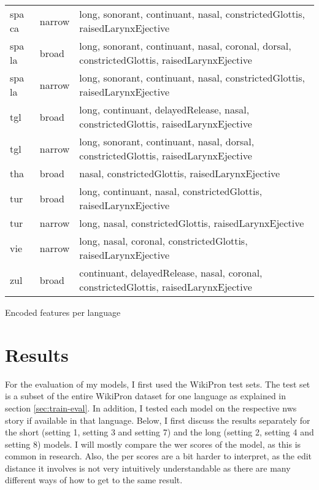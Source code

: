 {\begin{tabularx}{1.3\textwidth}{|llX|}
spa ca             & narrow        & long, sonorant, continuant, nasal, constrictedGlottis, raisedLarynxEjective                                                        \\
spa la             & broad         & long, sonorant, continuant, nasal, coronal, dorsal, constrictedGlottis, raisedLarynxEjective                                       \\
spa la             & narrow        & long, sonorant, continuant, nasal, constrictedGlottis, raisedLarynxEjective                                                        \\
tgl                & broad         & long, continuant, delayedRelease, nasal, constrictedGlottis, raisedLarynxEjective                                                  \\
tgl                & narrow        & long, sonorant, continuant, nasal, dorsal, constrictedGlottis, raisedLarynxEjective                                                \\
tha                & broad         & nasal, constrictedGlottis, raisedLarynxEjective                                                                                    \\
tur                & broad         & long, continuant, nasal, constrictedGlottis, raisedLarynxEjective                                                                  \\
tur                & narrow        & long, nasal, constrictedGlottis, raisedLarynxEjective                                                                              \\
vie                & narrow        & long, nasal, coronal, constrictedGlottis, raisedLarynxEjective                                                                     \\
zul                & broad         & continuant, delayedRelease, nasal, coronal, constrictedGlottis, raisedLarynxEjective  \\
\hline                                            
\end{tabularx}
\vspace{-0.2cm}
}{Encoded features per language}


\section{Results}

For the evaluation of my models, I first used the WikiPron test sets. The test set is a subset of the entire WikiPron dataset for one language as explained in section \ref{sec:train-eval}. In addition, I tested each model on the respective \ac{nws} story if available in that language. Below, I first discuss the results separately for the short (setting 1, setting 3 and setting 7) and the long (setting 2, setting 4 and setting 8) models. I will mostly compare the \ac{wer} scores of the model, as this is common in research. Also, the \ac{per} scores are a bit harder to interpret, as the edit distance it involves is not very intuitively understandable as there are many different ways of how to get to the same result. 

